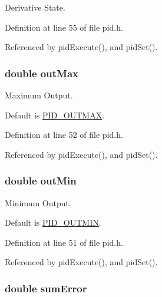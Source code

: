 Derivative State. 



Definition at line 55 of file pid.\-h.



Referenced by pid\-Execute(), and pid\-Set().

\hypertarget{struct_p_i_d_state_a3bcf8ed648b49bfe14cf141b134ba23b}{
\subsubsection[{out\-Max}]{\setlength{\rightskip}{0pt plus 5cm}double out\-Max}}\label{struct_p_i_d_state_a3bcf8ed648b49bfe14cf141b134ba23b}


Maximum Output. 

Default is \hyperlink{group__config_gaf36e4eab421932a006c7df7e84f11cf0}{P\-I\-D\-\_\-\-O\-U\-T\-M\-A\-X}. 

Definition at line 52 of file pid.\-h.



Referenced by pid\-Execute(), and pid\-Set().

\hypertarget{struct_p_i_d_state_a5df6ddfa37685d9035861b0d9f323a05}{
\subsubsection[{out\-Min}]{\setlength{\rightskip}{0pt plus 5cm}double out\-Min}}\label{struct_p_i_d_state_a5df6ddfa37685d9035861b0d9f323a05}


Minimum Output. 

Default is \hyperlink{group__config_ga684067981e82e4827607d0b0558812cb}{P\-I\-D\-\_\-\-O\-U\-T\-M\-I\-N}. 

Definition at line 51 of file pid.\-h.



Referenced by pid\-Execute(), and pid\-Set().

\hypertarget{struct_p_i_d_state_ac13ddfe17d63fa9b765378450d3d1b3f}{
\subsubsection[{sum\-Error}]{\setlength{\rightskip}{0pt plus 5cm}double sum\-Error}}\label{struct_p_i_d_state_ac13ddfe17d63fa9b765378450d3d1b3f}


